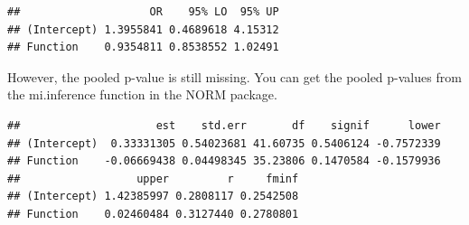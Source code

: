 \documentclass[]{book}
\newenvironment{Shaded}{\begin{snugshade}}{\end{snugshade}}
\newcommand{\KeywordTok}[1]{\textcolor[rgb]{0.13,0.29,0.53}{\textbf{#1}}}
\newcommand{\DataTypeTok}[1]{\textcolor[rgb]{0.13,0.29,0.53}{#1}}
\newcommand{\DecValTok}[1]{\textcolor[rgb]{0.00,0.00,0.81}{#1}}
\newcommand{\StringTok}[1]{\textcolor[rgb]{0.31,0.60,0.02}{#1}}
\newcommand{\ControlFlowTok}[1]{\textcolor[rgb]{0.13,0.29,0.53}{\textbf{#1}}}
\newcommand{\OperatorTok}[1]{\textcolor[rgb]{0.81,0.36,0.00}{\textbf{#1}}}
\newcommand{\NormalTok}[1]{#1}
\begin{document}
\begin{Shaded}
\end{Shaded}

\begin{verbatim}
##                    OR    95% LO  95% UP
## (Intercept) 1.3955841 0.4689618 4.15312
## Function    0.9354811 0.8538552 1.02491
\end{verbatim}

However, the pooled p-value is still missing. You can get the pooled
p-values from the mi.inference function in the NORM package.

\begin{Shaded}
\end{Shaded}

\begin{verbatim}
##                     est    std.err       df    signif      lower
## (Intercept)  0.33331305 0.54023681 41.60735 0.5406124 -0.7572339
## Function    -0.06669438 0.04498345 35.23806 0.1470584 -0.1579936
##                  upper         r     fminf
## (Intercept) 1.42385997 0.2808117 0.2542508
## Function    0.02460484 0.3127440 0.2780801
\end{verbatim}
\end{document}
